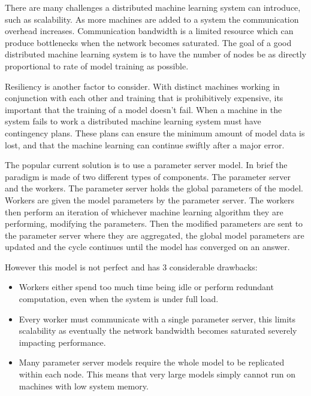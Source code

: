 There are many challenges a distributed machine learning system can introduce,
such as scalability. As more machines are added to a system the communication
overhead increases. Communication bandwidth is a limited resource which can
produce bottlenecks when the network becomes saturated. The goal of a good
distributed machine learning system is to have the number of nodes be as
directly proportional to rate of model training as possible.
\par

Resiliency is another factor to consider. With distinct machines working in
conjunction with each other and training that is prohibitively expensive, its
important that the training of a model doesn't fail. When a machine in the
system fails to work a distributed machine learning system must have contingency
plans. These plans can ensure the minimum amount of model data is lost, and that
the machine learning can continue swiftly after a major error.
\par


The popular current solution is to use a parameter server model. In brief the
paradigm is made of two different types of components. The parameter server and
the workers. The parameter server holds the global parameters of the model.
Workers are given the model parameters by the parameter server. The workers then
perform an iteration of whichever machine learning algorithm they are
performing, modifying the parameters. Then the modified parameters are sent to
the parameter server where they are aggregated, the global model parameters are
updated and the cycle continues until the model has converged on an answer.
\par

However this model is not perfect and has 3 considerable drawbacks:
\begin{itemize}
    \item Workers either spend too much time being idle or perform redundant
    computation, even when the system is under full load.
    \cite{googlemapreduce2008}
    \item Every worker must communicate with a single parameter server, this
    limits scalability as eventually the network bandwidth becomes saturated
    severely impacting performance. \cite{LI2014ParameterServers}
    \item Many parameter server models require the whole model to be replicated
    within each node. \cite{jia2018BeyondData} This means that very large models
    simply cannot run on machines with low system memory.  
\end{itemize}

